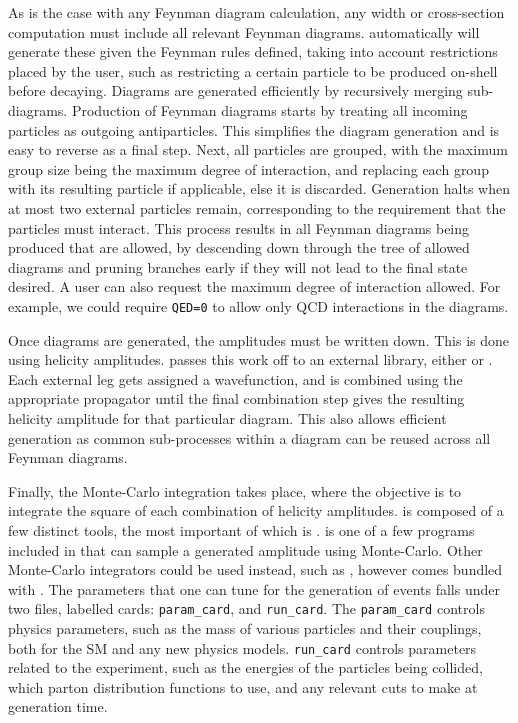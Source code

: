 As is the case with any Feynman diagram calculation, any width or cross-section computation must include all relevant Feynman diagrams.
\madgraph automatically will generate these given the Feynman rules defined, taking into account restrictions placed by the user, such as restricting a certain particle to be produced on-shell before decaying.
Diagrams are generated efficiently by recursively merging sub-diagrams.
Production of Feynman diagrams starts by treating all incoming particles as outgoing antiparticles.
This simplifies the diagram generation and is easy to reverse as a final step.
Next, all particles are grouped, with the maximum group size being the maximum degree of interaction, and replacing each group with its resulting particle if applicable, else it is discarded.
Generation halts when at most two external particles remain, corresponding to the requirement that the particles must interact.
This process results in all Feynman diagrams being produced that are allowed, by descending down through the tree of allowed diagrams and pruning branches early if they will not lead to the final state desired.
A user can also request the maximum degree of interaction allowed.
For example, we could require \texttt{QED=0} to allow only QCD interactions in the diagrams.

Once diagrams are generated, the amplitudes must be written down.
This is done using helicity amplitudes.
\madgraph passes this work off to an external library, either \helas \cite{Murayama:1992gi} or \aloha \cite{deAquino:2011ub}.
Each external leg gets assigned a wavefunction, and is combined using the appropriate propagator until the final combination step gives the resulting helicity amplitude for that particular diagram.
This also allows efficient generation as common sub-processes within a diagram can be reused across all Feynman diagrams.

Finally, the Monte-Carlo integration takes place, where the objective is to integrate the square of each combination of helicity amplitudes.
\madgraph is composed of a few distinct tools, the most important of which is \madevent.
\madevent is one of a few programs included in \madgraph that can sample a generated amplitude using Monte-Carlo.
Other Monte-Carlo integrators could be used instead, such as \pythia, however \madevent comes bundled with \madgraph.
The parameters that one can tune for the generation of events falls under two files, labelled cards: \texttt{param\_card}, and \texttt{run\_card}.
The \texttt{param\_card} controls physics parameters, such as the mass of various particles and their couplings, both for the SM and any new physics models.
\texttt{run\_card} controls parameters related to the experiment, such as the energies of the particles being collided, which parton distribution functions to use, and any relevant cuts to make at generation time.

